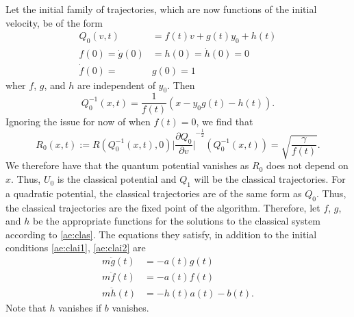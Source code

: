 \documentclass[11pt]{article}
\theoremstyle{remark}
\begin{document}
Let the initial family of trajectories, which are
now functions of the initial velocity, be of the form
\begin{subequations}
\begin{align} \label{ae:clas}
Q_0(v, t) &= f(t) v + g(t)y_0 +h(t)\\
f(0) = \dot{g}(0) &= h(0) = \dot{h}(0) =  0 \label{ae:clai1}\\
 \dot{f}(0) = & g(0) = 1 \label{ae:clai2}
\end{align}
\end{subequations}
wher $f$, $g$, and $h$ are independent of $y_0$. Then 
\[ Q_0^{-1}(x, t) = \frac{1}{f(t)} (x - y_0 g(t) -h(t) ) .\]
Ignoring the issue for now of when $f(t) = 0$, we find that 
\[
R_0(x,t) \ensuremath{:=} R(Q_0^{-1}(x,t), 0)
\ensuremath{\lvert {\ensuremath{\frac{\partial {Q_0}}{\partial {v}}}} \rvert}^{-\frac{1}{2}}(Q_0^{-1}(x,t)) 
= \sqrt{\frac{\gamma}{f(t)}}.
\] 
We therefore have that the quantum potential vanishes as $R_0$ does
not depend on $x$.  
Thus, $U_0$ is the classical potential and $Q_1$
will be the classical trajectories. 
For a quadratic potential, the classical trajectories are
of the same form as $Q_0$. Thus, the
classical trajectories are the fixed point of the algorithm. 
Therefore, let $f$, $g$, and $h$
be the appropriate functions for the solutions to the classical
system according to \eqref{ae:clas}.
The equations they satisfy, in addition to the initial conditions
\eqref{ae:clai1}, \eqref{ae:clai2} are
\begin{subequations} \label{ae:cla}
\begin{align}
m\ddot{g}(t) &= - a(t)g(t) \\
m\ddot{f}(t) &= - a(t)f(t) \\
m\ddot{h}(t) &= - h(t)a(t) - b(t). 
\end{align} 
\end{subequations}
Note that $h$ vanishes if $b$ vanishes. 
\end{document}
